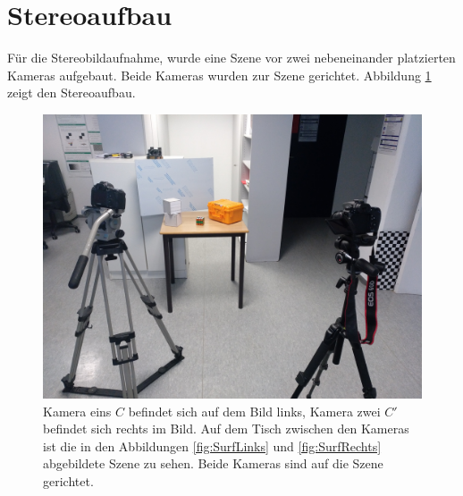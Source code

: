 \section{Stereoaufbau}


Für die Stereobildaufnahme, wurde eine Szene vor zwei nebeneinander platzierten Kameras aufgebaut. Beide Kameras wurden zur Szene gerichtet. Abbildung \ref{fig:StereoaufbauReal} zeigt den Stereoaufbau.\\





\begin{figure}[!htb]
	\centering
	\includegraphics[width=.7\linewidth]{images/SetUpSameResolution.jpg}
	\caption[Stereoaufbau im Überblick]{Kamera eins $C$ befindet sich auf dem Bild links, Kamera zwei $C'$ befindet sich rechts im Bild. Auf dem Tisch zwischen den Kameras ist die in den Abbildungen \ref{fig:SurfLinks} und \ref{fig:SurfRechts} abgebildete Szene zu sehen. Beide Kameras sind auf die Szene gerichtet.}
	\label{fig:StereoaufbauReal}
\end{figure}



